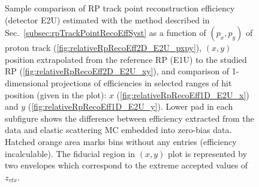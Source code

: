 \begin{figure}[h]
{\begin{subfigure}[b]{\linewidth}
		\end{subfigure}
	}
	\caption[Coparison of estimated RP track point reconstruction efficiency in 2D and 1D (detector E2U).]%
	{Sample comparison of RP track point reconstruction efficiency (detector E2U) estimated with the method described in Sec.~\ref{subsec:rpTrackPointRecoEffSyst} as a function of $(p_{x},p_{y})$ of proton track (\ref{fig:relativeRpRecoEff2D_E2U_pxpy}), $(x,y)$ position extrapolated from the reference RP (E1U) to the studied RP (\ref{fig:relativeRpRecoEff2D_E2U_xy}), and comparison of 1-dimensional projections of efficiencies in selected ranges of hit position (given in the plot): $x$ (\ref{fig:relativeRpRecoEff1D_E2U_x}) and $y$ (\ref{fig:relativeRpRecoEff1D_E2U_y}). Lower pad in each subfigure shows the difference between efficiency extracted from the data and elastic scattering MC embedded into zero-bias data. Hatched orange area marks bins without any entries (efficiency incalculable). The fiducial region in $(x,y)$ plot is represented by two envelopes which correspond to the extreme accepted values of $z_{vtx}$.%
	}\label{fig:relativeRpRecoEff_E2U}
\end{figure}










